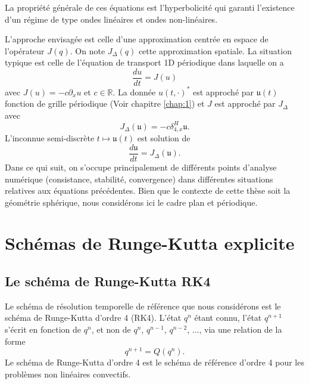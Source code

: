 La propriété générale de ces équations est l'hyperbolicité qui garanti l'existence d'un régime de type ondes linéaires et ondes non-linéaires.

L'approche envisagée est celle d'une approximation centrée en espace de l'opérateur $J(q)$. On note $J_{\Delta}(q)$ cette approximation spatiale. La situation typique est celle de l'équation de transport 1D périodique dans laquelle on a
\begin{equation}
\dfrac{d u}{dt} = J (u)
\label{eq:edo}
\end{equation}
avec $J(u) = - c \partial_x u$ et $c \in \mathbb{R}$. La donnée $u(t,\cdot)^*$ est approché par $\mathfrak{u}(t)$ fonction de grille périodique (Voir chapitre \ref{chap:1}) et $J$ est approché par $J_{\Delta}$ avec
\begin{equation}
J_{\Delta}(\mathfrak{u}) = - c \delta_{4,x}^H \mathfrak{u}.
\end{equation}
L'inconnue semi-discrète $t \mapsto \mathfrak{u}(t)$ est solution de 
\begin{equation}
\dfrac{d \mathfrak{u}}{dt} = J_{\Delta}(\mathfrak{u}).
\end{equation}
Dans ce qui suit, on s'occupe principalement de différents points d'analyse numérique (consistance, stabilité, convergence) dans différentes situations relatives aux équations précédentes. Bien que le contexte de cette thèse soit la géométrie sphérique, nous considérons ici le cadre plan et périodique.















\section{Schémas de Runge-Kutta explicite}

\subsection{Le schéma de Runge-Kutta RK4}

Le schéma de résolution temporelle de référence que nous considérons est le schéma de Runge-Kutta d'ordre 4 (RK4). L'état $q^n$ étant connu, l'état $q^{n+1}$ s'écrit en fonction de $q^n$, et non de $q^n$, $q^{n-1}$, $q^{n-2}$, ..., via une relation de la forme
\begin{equation}
q^{n+1} = Q(q^n).
\label{eq:recurrence_rk}
\end{equation}
Le schéma de Runge-Kutta d'ordre 4 est le schéma de référence d'ordre 4 pour les problèmes non linéaires convectifs. 

